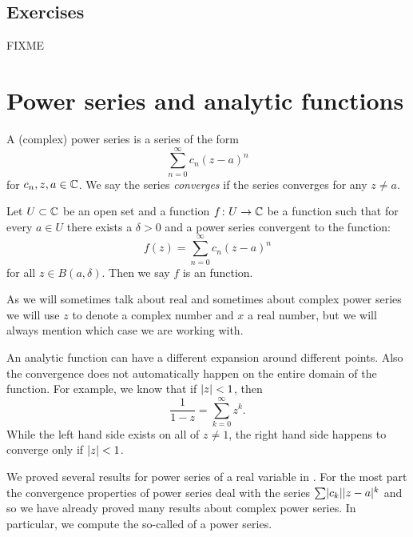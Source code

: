 \subsection{Exercises}

\begin{exercise}
FIXME
\end{exercise}


\sectionnewpage
\section{Power series and analytic functions}
\label{sec:FIXME}


A (complex) power series is a series of the form
\begin{equation*}
\sum_{n=0}^\infty c_n {(z-a)}^n
\end{equation*}
for $c_n, z, a \in {\mathbb{C}}$.  We say the series
\emph{converges} if the series converges for
any $z \not= a$.

Let $U \subset {\mathbb{C}}$ be an open set and
a function $f \colon U \to {\mathbb{C}}$ be a function such that
for every $a \in U$ there exists a $\delta > 0$ and a power
series convergent to the function:
\begin{equation*}
f(z) = \sum_{n=0}^\infty c_n {(z-a)}^n
\end{equation*}
for all $z \in B(a,\delta)$.
Then we say $f$ is an \emph{} function.

As we will sometimes talk about real and sometimes about complex power
series we will use $z$ to denote a complex number and $x$ a real number, but
we will always mention which case we are working with.

An analytic function can have a different expansion around different
points.  Also the convergence does not automatically happen on the entire
domain of the function.  For example, we know that if $\lvert {z} \rvert < 1$, then
\begin{equation*}
\frac{1}{1-z} = \sum_{k=0}^\infty z^k .
\end{equation*}
While the left hand side exists on all of $z \not= 1$, the right hand side
happens to converge only if $\lvert {z} \rvert < 1$.

We proved several results for power series of a real variable in
.   For the most part the convergence
properties of power series deal with the series $\sum \lvert {c_k} \rvert
\lvert {z-a} \rvert^k$ and so we have already proved many results about complex power
series.  In particular, we compute the so-called
\emph{} of a power series.

